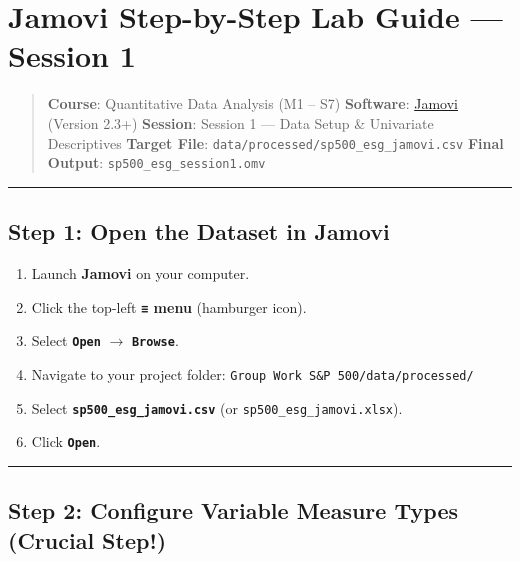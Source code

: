 \documentclass[
]{article}
\author{}
\date{}
\providecommand{\tightlist}{%
  \setlength{\itemsep}{0pt}\setlength{\parskip}{0pt}}
\begin{document}
\section{Jamovi Step-by-Step Lab Guide --- Session
1}\label{jamovi-step-by-step-lab-guide-session-1}

\begin{quote}
\textbf{Course}: Quantitative Data Analysis (M1 -- S7)
\textbf{Software}: \href{https://www.jamovi.org/}{Jamovi} (Version 2.3+)
\textbf{Session}: Session 1 --- Data Setup \& Univariate Descriptives
\textbf{Target File}: \texttt{data/processed/sp500\_esg\_jamovi.csv}
\textbf{Final Output}: \texttt{sp500\_esg\_session1.omv}
\end{quote}

\begin{center}\rule{0.5\linewidth}{0.5pt}\end{center}

\subsection{Step 1: Open the Dataset in
Jamovi}\label{step-1-open-the-dataset-in-jamovi}

\begin{enumerate}
\def\labelenumi{\arabic{enumi}.}
\tightlist
\item
  Launch \textbf{Jamovi} on your computer.
\item
  Click the top-left \textbf{\texttt{≡} menu} (hamburger icon).
\item
  Select \textbf{\texttt{Open}} \(\rightarrow\)
  \textbf{\texttt{Browse}}.
\item
  Navigate to your project folder:
  \texttt{Group\ Work\ S\&P\ 500/data/processed/}
\item
  Select \textbf{\texttt{sp500\_esg\_jamovi.csv}} (or
  \texttt{sp500\_esg\_jamovi.xlsx}).
\item
  Click \textbf{\texttt{Open}}.
\end{enumerate}

\begin{center}\rule{0.5\linewidth}{0.5pt}\end{center}

\subsection{Step 2: Configure Variable Measure Types (Crucial
Step!)}\label{step-2-configure-variable-measure-types-crucial-step}
\end{document}
